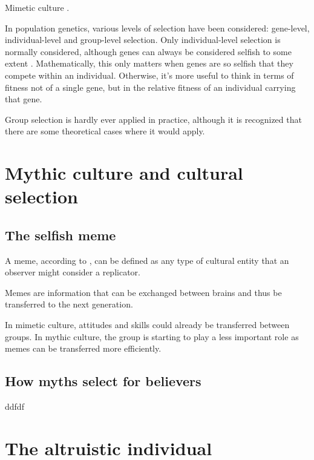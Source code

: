 \documentclass{article}
\begin{document}
Mimetic culture \citet{donald1991}.




In population genetics, various levels of selection have been considered: gene-level, individual-level and group-level selection. Only individual-level selection is normally considered, although genes can always be considered selfish to some extent \citep{dawkins1976}. Mathematically, this only matters when genes are so selfish that they compete within an individual. Otherwise, it's more useful to think in terms of fitness not of a single gene, but in the relative fitness of an individual carrying that gene.

Group selection is hardly ever applied in practice, although it is recognized that there are some theoretical cases where it would apply.


\section{Mythic culture and cultural selection}

\subsection{The selfish meme}
\label{sec:memes}

A meme, according to \citet{dawkins1976}, can be defined as any type of cultural entity that an observer might consider a replicator.

Memes are information that can be exchanged between brains and thus be transferred to the next generation.

In mimetic culture, attitudes and skills could already be transferred between groups.
In mythic culture, the group is starting to play a less important role as memes can be transferred more efficiently.

\subsection{How myths select for believers}

ddfdf

\section{The altruistic individual}
\end{document}
